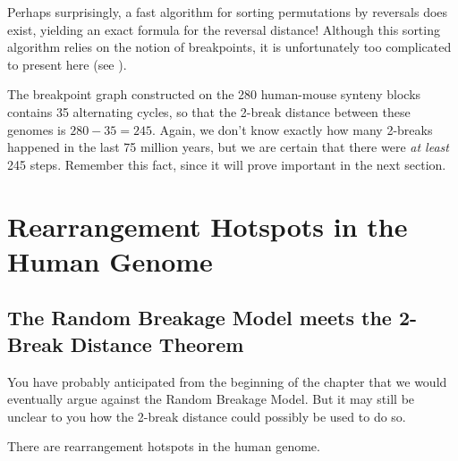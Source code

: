 \noindent Perhaps surprisingly, a fast algorithm for sorting permutations by reversals does exist, yielding an exact formula for the reversal distance!  Although this sorting algorithm relies on the notion of breakpoints, it is unfortunately too complicated to present here (see ).

The breakpoint graph constructed on the 280 human-mouse synteny blocks contains 35 alternating cycles, so that the 2-break distance between these genomes is $280 - 35 = 245$.  Again, we don't know exactly how many 2-breaks happened in the last 75 million years, but we are certain that there were \emph{at least} 245 steps. Remember this fact, since it will prove important in the next section.\\

\FloatBarrier
\section{Rearrangement Hotspots in the Human Genome}
\label{sec:rearrangement_hotspots_in_the_human_genome}

\subsection{The Random Breakage Model meets the 2-Break Distance Theorem}
\label{subsec:the_random_breakage_model_meets_the_2-break_distance_theorem}

You have probably anticipated from the beginning of the chapter that we would eventually argue against the Random Breakage Model.  But it may still be unclear to you how the 2-break distance could possibly be used to do so.

\begin{namedtheorem}
There are rearrangement hotspots in the human \linebreak genome. 
\end{namedtheorem}

